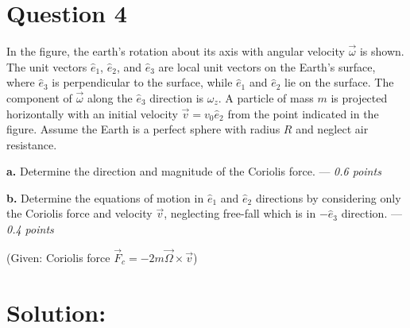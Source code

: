 \section*{Question 4}
\begin{figure}
\end{figure}
In the figure, the earth's rotation about its axis with angular velocity $\vec{\omega}$ is shown. The unit vectors $\hat{e}_1$, $\hat{e}_2$, and $\hat{e}_3$ are local unit vectors on the Earth's surface, where $\hat{e}_3$ is perpendicular to the surface, while $\hat{e}_1$ and $\hat{e}_2$ lie on the surface. The component of $\vec{\omega}$ along the $\hat{e}_3$ direction is $\omega_z$. A particle of mass $m$ is projected horizontally with an initial velocity $\vec{v}=v_0\hat{e}_2$ from the point indicated in the figure. Assume the Earth is a perfect sphere with radius $R$ and neglect air resistance.

\textbf{a.} Determine the direction and magnitude of the Coriolis force. --- \textit{0.6 points}

\textbf{b.} Determine the equations of motion in $\hat{e}_1$ and $\hat{e}_2$ directions by considering only the Coriolis force and velocity $\vec{v}$, neglecting free-fall which is in $-\hat{e}_3$ direction. --- \textit{0.4 points}

(Given: Coriolis force $\vec{F}_c = -2m \vec{\Omega} \times \vec{v}$)

\section*{Solution:}


